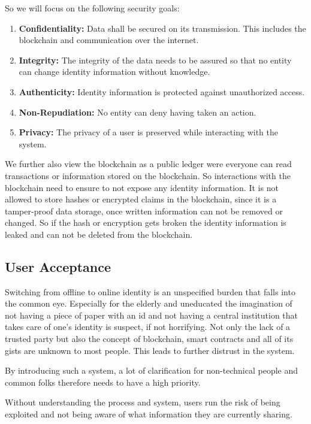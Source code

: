 So we will focus on the following security goals:
\begin{enumerate}
\item \textbf{Confidentiality:} Data shall be secured on its transmission. This includes the blockchain and communication over the internet. 
\item \textbf{Integrity:} The integrity of the data needs to be assured so that no entity can change identity information without knowledge. 
\item \textbf{Authenticity:} Identity information is protected against unauthorized access. 
\item \textbf{Non-Repudiation:} No entity can deny having taken an action.
\item \textbf{Privacy:} The privacy of a user is preserved while interacting with the system. 
\end{enumerate}

We further also view the blockchain as a public ledger were everyone can read transactions or information stored on the blockchain. So interactions with the blockchain need to ensure to not expose any identity information. 
It is not allowed to store hashes or encrypted claims in the blockchain, since it is a tamper-proof data storage, once written information can not be removed or changed. So if the hash or encryption gets broken the identity information is leaked and can not be deleted from the blockchain.  

\subsection{User Acceptance}
\label{sec:userAcceptance}

Switching from offline to online identity is an unspecified burden that falls into the common eye.
Especially for the elderly and uneducated the imagination of not having a piece of paper with an id and not having a central
institution that takes care of one's identity is suspect, if not horrifying.
Not only the lack of a trusted party but also the concept of blockchain, smart contracts and all of its gists are unknown
to most people. This leads to further distrust in the system.

By introducing such a system, a lot of clarification for non-technical people and common folks therefore needs to have a
high priority.

Without understanding the process and system, users run the risk of being exploited and not being aware of what information
they are currently sharing.

